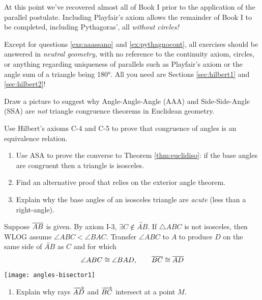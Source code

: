 At this point we've recovered almost all of Book I prior to the application of the parallel postulate. Including Playfair's axiom allows the remainder of Book I to be completed, including Pythagoras', all \emph{without circles!}

\begin{exercises}
Except for questions \ref*{exs:aaassano} and \ref*{ex:pythagnocont}, all exercises should be answered in \emph{neutral geometry,} with no reference to the continuity axiom, circles, or anything regarding uniqueness of parallels such as Playfair's axiom or the angle sum of a triangle being \ang{180}. All you need are Sections \ref*{sec:hilbert1} and \ref*{sec:hilbert2}!
\begin{enumerate}\itemsep3pt
  \item\label{exs:aaassano} Draw a picture to suggest why Angle-Angle-Angle (AAA) and Side-Side-Angle (SSA) are \emph{not} triangle congruence theorems in Euclidean geometry.
  
  
  \item Use Hilbert's axioms C-4 and C-5 to prove that congruence of angles is an equivalence relation.
  
  
  \item\label{exs:isoconverse}\begin{enumerate}
    \item Use ASA to prove the converse to Theorem \ref{thm:euclidiso}: if the base angles are congruent then a triangle is isosceles.
    \item Find an alternative proof that relies on the exterior angle theorem.
    \item Explain why the base angles of an isosceles triangle are \emph{acute} (less than a right-angle).
  \end{enumerate}
  
  
  \begin{minipage}[t]{0.68\linewidth}\vspace{0pt}
  \item Suppose $\overline{AB}$ is given. By axiom I-3, $\exists C\not\in\overleftrightarrow{AB}$.\smallbreak
	If $\triangle ABC$ is not isosceles, then WLOG assume $\angle ABC<\angle BAC$.\smallbreak
	Transfer $\angle ABC$ to $A$ to produce $D$ on the same side of $\overleftrightarrow{AB}$ as $C$ and for which
	\[\angle ABC\cong\angle BAD,\qquad \overline{BC}\cong\overline{AD}\]
	\end{minipage}\begin{minipage}[t]{0.32\linewidth}\vspace{0pt}
		\flushright\texttt{[image: angles-bisector1]}
	\end{minipage}\vspace{-20pt}
	\begin{enumerate}
	  \item Explain why rays $\overrightarrow{AD}$ and $\overrightarrow{BC}$ intersect at a point $M$.
	  

\end{enumerate}
\end{enumerate}
\end{exercises}
